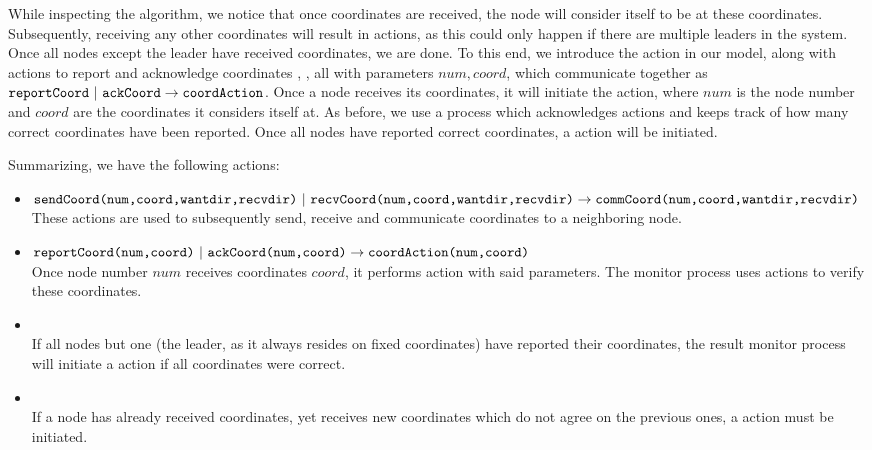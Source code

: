While inspecting the algorithm, we notice that once coordinates are received, the node will consider itself to be at these coordinates. Subsequently, receiving any other coordinates will result in  actions, as this could only happen if there are multiple leaders in the system. Once all nodes except the leader have received coordinates, we are done. To this end, we introduce the  action in our model, along with actions to report and acknowledge coordinates , , all with parameters $num,coord$, which communicate together as $\texttt{reportCoord} ~|~ \texttt{ackCoord} \rightarrow \texttt{coordAction}$. Once a node receives its coordinates, it will initiate the  action, where $num$ is the node number and $coord$ are the coordinates it considers itself at. As before, we use a  process which acknowledges  actions and keeps track of how many correct coordinates have been reported. Once all nodes have reported correct coordinates, a  action will be initiated.

Summarizing, we have the following actions:

\begin{itemize}
\item $\texttt{sendCoord(num,coord,wantdir,recvdir)} ~|~ \texttt{recvCoord(num,coord,wantdir,recvdir)} \\
       \rightarrow \texttt{commCoord(num,coord,wantdir,recvdir)}$ \\
These actions are used to subsequently send, receive and communicate coordinates to a neighboring node.
\item $\texttt{reportCoord(num,coord)} ~|~ \texttt{ackCoord(num,coord)} \rightarrow \texttt{coordAction(num,coord)}$ \\
Once node number $num$ receives coordinates $coord$, it performs  action with said parameters. The monitor process uses  actions to verify these coordinates.
\item {} \\
If all nodes but one (the leader, as it always resides on fixed coordinates) have reported their coordinates, the result monitor process will initiate a  action if all coordinates were correct.
\item {} \\
If a node has already received coordinates, yet receives new coordinates which do not agree on the previous ones, a  action must be initiated.
\end{itemize}

